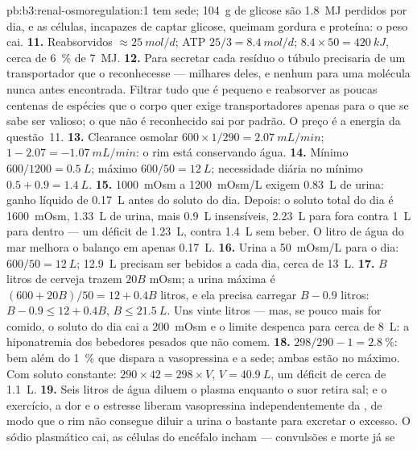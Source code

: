 \begin{solution}{pb:b3:renal-osmoregulation:1}
tem sede; \qty{104}{g} de glicose são \qty{1.8}{MJ} perdidos por dia, e
as células, incapazes de captar glicose, queimam gordura e proteína: o
peso cai.
\textbf{11.} Reabsorvidos $\approx \qty{25}{mol/d}$; ATP $25/3 =
\qty{8.4}{mol/d}$; $8.4\times 50 = \qty{420}{kJ}$, cerca de
\qty{6}{\%} de \qty{7}{MJ}.
\textbf{12.} Para secretar cada resíduo o túbulo precisaria de um
transportador que o reconhecesse --- milhares deles, e nenhum para uma
molécula nunca antes encontrada. Filtrar tudo que é pequeno e reabsorver
as poucas centenas de espécies que o corpo quer exige transportadores
apenas para o que se sabe ser valioso; o que não é reconhecido sai por
padrão. O preço é a energia da questão~11.
\textbf{13.} Clearance osmolar $600\times 1/290 = \qty{2.07}{mL/min}$;
 $1 - 2.07 = -\qty{1.07}{mL/min}$: o rim está
conservando água.
\textbf{14.} Mínimo $600/1200 = \qty{0.5}{L}$; máximo $600/50 =
\qty{12}{L}$; necessidade diária no mínimo $0.5 + 0.9 = \qty{1.4}{L}$.
\textbf{15.} \qty{1000}{mOsm} a \qty{1200}{mOsm/L} exigem \qty{0.83}{L}
de urina: ganho líquido de \qty{0.17}{L} antes do soluto do dia. Depois:
o soluto total do dia é \qty{1600}{mOsm}, \qty{1.33}{L} de urina, mais
\qty{0.9}{L} insensíveis, \qty{2.23}{L} para fora contra \qty{1}{L} para
dentro --- um déficit de \qty{1.23}{L}, contra \qty{1.4}{L} sem beber. O
litro de água do mar melhora o balanço em apenas \qty{0.17}{L}.
\textbf{16.} Urina a \qty{50}{mOsm/L} para o dia: $600/50 =
\qty{12}{L}$; \qty{12.9}{L} precisam ser bebidos a cada dia, cerca de
\qty{13}{L}.
\textbf{17.} $B$ litros de cerveja trazem $20B$ mOsm; a urina máxima é
$(600 + 20B)/50 = 12 + 0.4B$ litros, e ela precisa carregar $B - 0.9$
litros: $B - 0.9 \le 12 + 0.4B$, $B \le \qty{21.5}{L}$. Uns vinte litros
--- mas, se pouco mais for comido, o soluto do dia cai a
\qty{200}{mOsm} e o limite despenca para cerca de \qty{8}{L}: a
hiponatremia dos bebedores pesados que não comem.
\textbf{18.} $298/290 - 1 = \qty{2.8}{\%}$: bem além do \qty{1}{\%} que
dispara a vasopressina e a sede; ambas estão no máximo. Com soluto
constante: $290\times 42 = 298\times V$, $V = \qty{40.9}{L}$, um déficit
de cerca de \qty{1.1}{L}.
\textbf{19.} Seis litros de água diluem o plasma enquanto o suor retira
sal; e o exercício, a dor e o estresse liberam vasopressina
independentemente da , de modo que o rim não consegue
diluir a urina o bastante para excretar o excesso. O sódio plasmático
cai, as células do encéfalo incham --- convulsões e morte já se

\end{solution}
